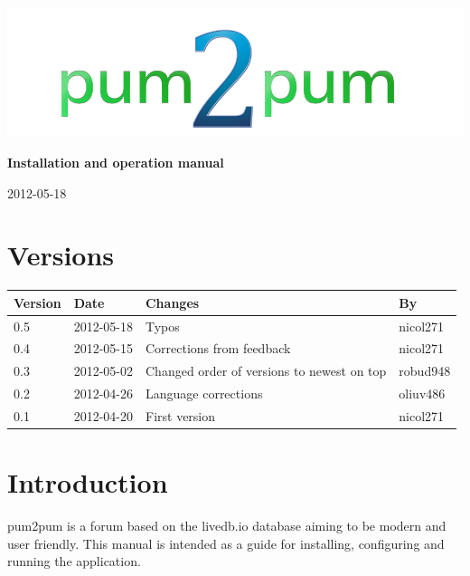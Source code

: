 \documentclass[a4paper, 12pt, titlepage]{article}
\begin{document}
\setlength{\parindent}{0pt}

	\begin{titlepage}

		\includegraphics[scale=0.4]{logoNormal.png}

		\vspace{6cm}

		\begin{center}
			\Huge{\textbf{Installation and operation manual}} %

			\vspace{0.5cm}

			\huge{2012-05-18} %
		\end{center}

	\end{titlepage}

	\tableofcontents
	\newpage

	\section*{Versions}
	\begin{tabularx}{1\textwidth}{|l|l|X|l|}
		\hline
		\bf{Version} & \bf{Date} & \bf{Changes} & \bf{By} \\
		\hline
		0.5 & 2012-05-18 & Typos & nicol271 \\
		\hline
		0.4 & 2012-05-15 & Corrections from feedback & nicol271 \\
		\hline
		0.3 & 2012-05-02 & Changed order of versions to newest on top & robud948 \\
		\hline
		0.2 & 2012-04-26 & Language corrections & oliuv486 \\
		\hline
		0.1 & 2012-04-20 & First version & nicol271 \\
		\hline
	\end{tabularx}
	\newpage

	\section{Introduction}
	pum2pum is a forum based on the livedb.io database aiming to be modern and user friendly. This manual is intended as a guide for installing, configuring and running the application.
\end{document}
